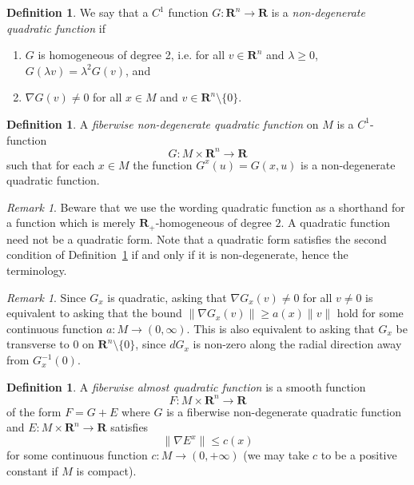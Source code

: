 \documentclass[reqno]{amsart}
\theoremstyle{theorem}
\theoremstyle{remark}
\newtheorem{remark}[corollary]{Remark}
\theoremstyle{definition}
\newtheorem{definition}[corollary]{Definition}
\newcommand{\bR}{\mathbf{R}}
\newcommand{\R}{\mathbf{R}}
\newcommand{\quadfunc}{2-homogeneous function}
\renewcommand{\quadfunc}{quadratic function}
\begin{document}
\begin{definition} \label{def:non-deg-quadratic}
We say that a $C^1$ function $G:\bR^n \to \bR$ is a {\em non-degenerate \quadfunc} if 
\begin{enumerate}
\item $G$ is homogeneous of degree 2, i.e. for all $v\in \R^n$ and $\lambda \geq 0$, $G(\lambda v)=\lambda^2 G(v)$, and
\item $\nabla G(v) \neq 0$ for all $x\in M$ and $v \in \R^n\setminus\{0\}$.
\end{enumerate}
\end{definition}


\begin{definition}\label{def:quadfun}
A \emph{fiberwise non-degenerate \quadfunc} on $M$ is a $C^1$-function $$G:M \times \R^n \to \R$$ such that for each $x \in M$ the function $G^x(u)=G(x,u)$ is a non-degenerate \quadfunc.
\end{definition}


\begin{remark} Beware that we use the wording quadratic function as a shorthand for a function which is merely $\R_+$-homogeneous of degree $2$. A quadratic function need not be a quadratic form. Note that a quadratic form satisfies the second condition of Definition~\ref{def:quadfun} if and only if it is non-degenerate, hence the terminology.  \end{remark}


\begin{remark}
 Since $G_x$ is quadratic, asking that $\nabla G_x(v) \neq 0$ for all $v \neq 0$ is equivalent to asking that the bound $\| \nabla G_x(v) \| \geq a(x) \| v\|$ hold for some continuous function $a:M \to (0,\infty)$. This is also equivalent to asking that $G_x$ be transverse to $0$ on $\R^n \setminus \{ 0 \}$, since $dG_x$ is non-zero along the radial direction away from $G_x^{-1}(0)$.
\end{remark}






\begin{definition}\label{def:almostquadfun}
A \emph{fiberwise almost quadratic function} is a smooth function $$F:M\times \R^n\to \R$$ of the form $F=G+E$
where $G$ is a fiberwise non-degenerate quadratic function and $E:M\times \R^n\to \R$ satisfies
\[\|\nabla E^x\|\leq c(x)\]
for some continuous function $c:M\to (0,+\infty)$ (we may take $c$ to be a positive constant if $M$ is compact).
\end{definition}
\end{document}
